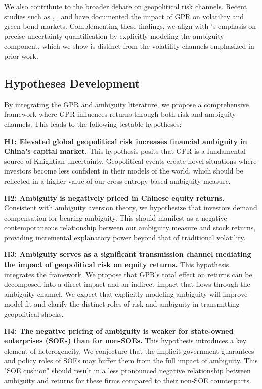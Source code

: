 \documentclass[preprint,12pt,authoryear]{elsarticle}
\begin{document}
We also contribute to the broader debate on geopolitical risk channels. Recent studies such as \citet{Bouri2024}, \citet{Liu2024}, and \citet{Zhang2023} have documented the impact of GPR on volatility and green bond markets. Complementing these findings, we align with \citet{Nemani2023}’s emphasis on precise uncertainty quantification by explicitly modeling the ambiguity component, which we show is distinct from the volatility channels emphasized in prior work.

\subsection{Hypotheses Development}

By integrating the GPR and ambiguity literature, we propose a comprehensive framework where GPR influences returns through both risk and ambiguity channels. This leads to the following testable hypotheses:

\textbf{H1: Elevated global geopolitical risk increases financial ambiguity in China's capital market.}
This hypothesis posits that GPR is a fundamental source of Knightian uncertainty. Geopolitical events create novel situations where investors become less confident in their models of the world, which should be reflected in a higher value of our cross-entropy-based ambiguity measure.

\textbf{H2: Ambiguity is negatively priced in Chinese equity returns.}
Consistent with ambiguity aversion theory, we hypothesize that investors demand compensation for bearing ambiguity. This should manifest as a negative contemporaneous relationship between our ambiguity measure and stock returns, providing incremental explanatory power beyond that of traditional volatility.

\textbf{H3: Ambiguity serves as a significant transmission channel mediating the impact of geopolitical risk on equity returns.}
This hypothesis integrates the framework. We propose that GPR's total effect on returns can be decomposed into a direct impact and an indirect impact that flows through the ambiguity channel. We expect that explicitly modeling ambiguity will improve model fit and clarify the distinct roles of risk and ambiguity in transmitting geopolitical shocks.

\textbf{H4: The negative pricing of ambiguity is weaker for state-owned enterprises (SOEs) than for non-SOEs.}
This hypothesis introduces a key element of heterogeneity. We conjecture that the implicit government guarantees and policy roles of SOEs may buffer them from the full impact of ambiguity. This "SOE cushion" should result in a less pronounced negative relationship between ambiguity and returns for these firms compared to their non-SOE counterparts.
\end{document}
